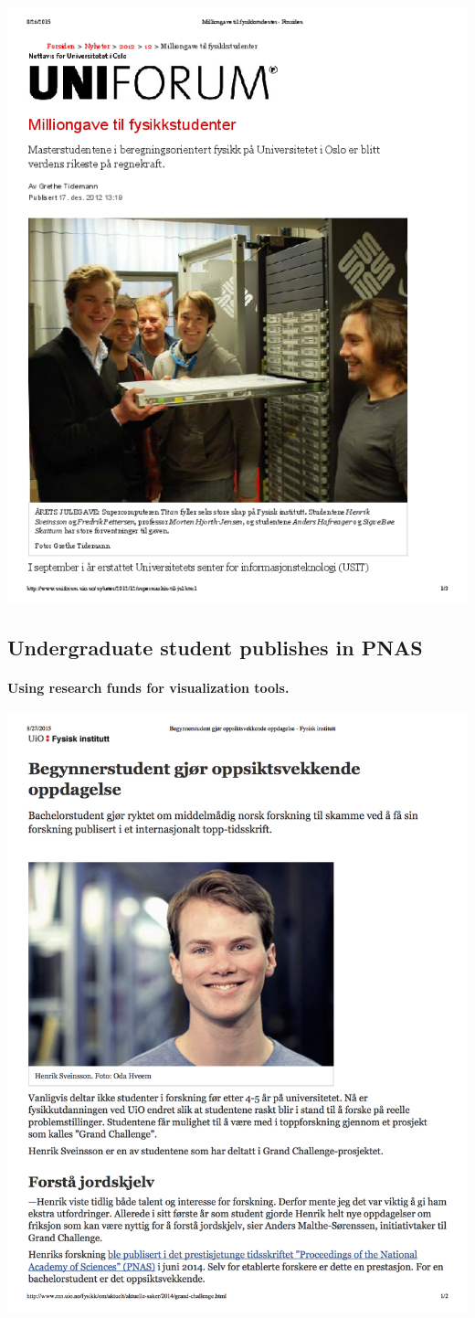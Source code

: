 \documentclass[%
oneside,                 %
final,                   %
10pt]{article}
\begin{document}
\centerline{\includegraphics[width=0.7\linewidth]{fig-future/uniforum-0.png}}




\subsection{Undergraduate student publishes in PNAS}

\paragraph{Using research funds for visualization tools.}


\centerline{\includegraphics[width=0.7\linewidth]{fig-future/pnas.png}}
\end{document}
